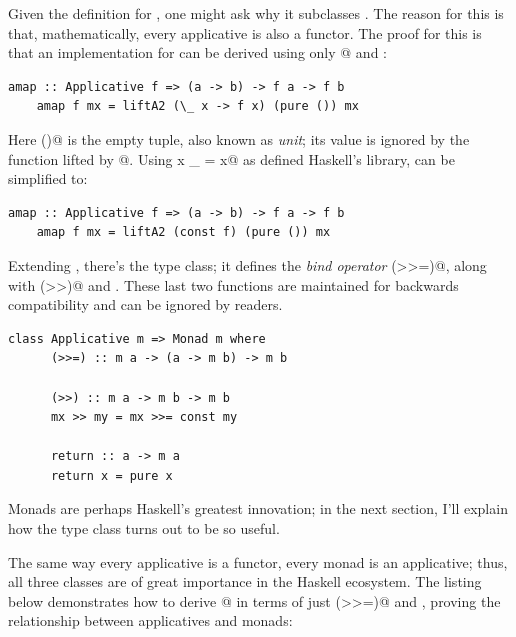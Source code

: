 \documentclass[UdineBachThesis,american,11pt]{PhdThesis}
\begin{document}
  Given the definition for \lstinline@Applicative@, one might ask why it
  subclasses \lstinline@Functor@. The reason for this is that, mathematically,
  every applicative is also a functor. The proof for this is that an
  implementation for \lstinline@fmap@ can be derived using only
  @ and \lstinline@pure@:

  \begin{lstlisting}[gobble=4,basicstyle=\ttfamily\small]
    amap :: Applicative f => (a -> b) -> f a -> f b
    amap f mx = liftA2 (\_ x -> f x) (pure ()) mx
  \end{lstlisting}

  Here \lstinline@()@ is the empty tuple, also known as \emph{unit}; its value
  is ignored by the function lifted by @. Using
  \lstinline@const x _ = x@ as defined Haskell's library, \lstinline@amap@ can
  be simplified to:

  \begin{lstlisting}[gobble=4,basicstyle=\ttfamily\small]
    amap :: Applicative f => (a -> b) -> f a -> f b
    amap f mx = liftA2 (const f) (pure ()) mx
  \end{lstlisting}

  Extending \lstinline@Applicative@, there's the \lstinline@Monad@ type class;
  it defines the \emph{bind operator} \lstinline@(>>=)@, along with
  \lstinline@(>>)@ and \lstinline@return@. These last two functions are
  maintained for backwards compatibility and can be ignored by readers.

  \begin{lstlisting}[gobble=4,basicstyle=\ttfamily\small]
    class Applicative m => Monad m where
      (>>=) :: m a -> (a -> m b) -> m b

      (>>) :: m a -> m b -> m b
      mx >> my = mx >>= const my

      return :: a -> m a
      return x = pure x
  \end{lstlisting}

  Monads are perhaps Haskell's greatest innovation; in the next section, I'll
  explain how the \lstinline@Monad@ type class turns out to be so useful.

  The same way every applicative is a functor, every monad is an applicative;
  thus, all three classes are of great importance in the Haskell ecosystem. The
  listing below demonstrates how to derive @ in terms of just
  \lstinline@(>>=)@ and \lstinline@return@, proving the relationship between
  applicatives and monads:
\end{document}
